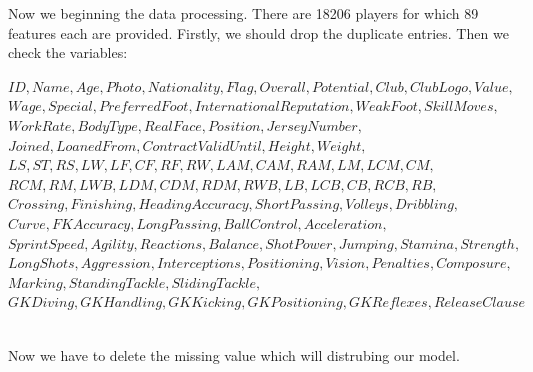 \documentclass{article}
\begin{document}
Now we beginning the data processing.
There are 18206 players for which 89 features each are provided. Firstly, we should drop the duplicate entries. 
Then we check the variables: 
\begin{center}
$ID, Name, Age, Photo, Nationality, Flag, Overall, Potential, Club, Club Logo, Value,$\\ 
$Wage, Special, Preferred Foot, International Reputation, Weak Foot, Skill Moves,$\\
$Work Rate, Body Type, Real Face, Position, Jersey Number, $\\
$Joined, Loaned From, Contract Valid Until,Height, Weight,$\\
$LS, ST, RS, LW, LF, CF, RF, RW, LAM, CAM, RAM, LM, LCM, CM,$\\
$RCM, RM, LWB, LDM, CDM, RDM, RWB, LB, LCB, CB, RCB, RB,$ \\
$Crossing, Finishing, HeadingAccuracy, ShortPassing, Volleys, Dribbling,$\\ 
$Curve, FKAccuracy, LongPassing, BallControl, Acceleration,$\\ 
$SprintSpeed, Agility, Reactions, Balance, ShotPower, Jumping, Stamina, Strength,$\\ $LongShots, Aggression, Interceptions, Positioning, Vision, Penalties, Composure,$\\ $Marking, StandingTackle, SlidingTackle,$\\
$GKDiving, GKHandling, GKKicking, GKPositioning,
GKReflexes, Release Clause$
\end{center}
\\
Now we have to delete the missing value which will distrubing our model. 
\end{document}
